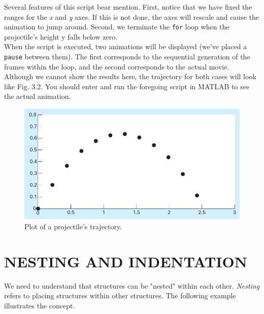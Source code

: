 \documentclass[../main.tex]{subfiles}
\begin{document}
\begin{example}
    Several features of this script bear mention. First, notice that we have fixed the ranges for
the \emph{x} and \emph{y} axes. If this is not done, the axes will rescale and cause the animation to jump
around. Second, we terminate the \texttt{for} loop when the projectile's height y falls below zero.\\
\indent When the script is executed, two animations will be displayed (we've placed a \texttt{pause}
between them). The first corresponds to the sequential generation of the frames within the
loop, and the second corresponds to the actual movie. Although we cannot show the results
here, the trajectory for both cases will look like Fig. 3.2. You should enter and run the foregoing
script in MATLAB to see the actual animation.\\

\begin{figure}[h]
    \includegraphics[width=0.70\linewidth]{./images/example_3_3_2}
    \caption{Plot of a projectile's trajectory.}
\end{figure}

\end{example}

\section{NESTING AND INDENTATION}
\noindent We need to understand that structures can be "nested" within each other. \emph{Nesting} refers to
placing structures within other structures. The following example illustrates the concept.\\
\end{document}
